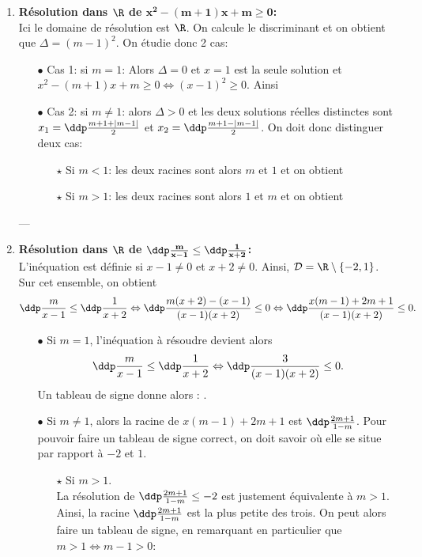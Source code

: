 \documentclass[a4paper, 11pt,reqno]{article}
\begin{document}
\begin{correction} 
\begin{enumerate}
\item \textbf{R\'esolution dans $\mathbf{\R}$ de $\mathbf{x^2-(m+1)x+m\geq 0}$:}\\
\noindent  Ici le domaine de r\'esolution est $\R$. On calcule le discriminant et on obtient que $\Delta=(m-1)^2$. On \'etudie donc 2 cas:
 \begin{itemize}
 \item[$\bullet$] Cas 1: si $m=1$: Alors $\Delta=0$ et $x=1$ est la seule solution et $x^2-(m+1)x+m\geq 0\Leftrightarrow (x-1)^2\geq 0$. Ainsi 
 \item[$\bullet$] Cas 2: si $m\not= 1$: alors $\Delta>0$ et les deux solutions r\'eelles distinctes sont 
 $x_1=\ddp\frac{m+1+|m-1|}{2}$ et $x_2=\ddp\frac{m+1-|m-1|}{2}$. On doit donc distinguer deux cas:
 \begin{itemize}
 \item[$\star$] Si $m<1$: les deux racines sont alors $m$ et $1$ et on obtient 
 \item[$\star$] Si $m>1$: les deux racines sont alors $1$ et $m$ et on obtient 
 \end{itemize}
 \end{itemize}
 ---
\item \textbf{R\'esolution dans $\mathbf{\R}$ de $\mathbf{\ddp\frac{m}{x-1} \leq \ddp\frac{1}{x+2}}$:}\\
\noindent L'in\'equation est d\'efinie si $x-1\not= 0$ et $x+2\not= 0$. Ainsi, $\mathcal{D}=\R\setminus\lbrace  -2,1 \rbrace$.
Sur cet ensemble, on obtient
$$
\ddp\frac{m}{x-1}\leq \ddp\frac{1}{x+2} \Leftrightarrow  \ddp\frac{m(x+2)-(x-1)}{(x-1)(x+2)}\leq 0
\Leftrightarrow  \ddp\frac{x(m-1) +2m+1  }{(x-1)(x+2)}\leq 0.
$$
\begin{itemize}
 \item[$\bullet$] Si $m=1$, l'in\'equation \`a r\'esoudre devient alors 
$$\ddp\frac{m}{x-1}\leq \ddp\frac{1}{x+2} \Leftrightarrow  \ddp\frac{3}{(x-1)(x+2)}\leq 0.$$
Un tableau de signe donne alors : .
\item[$\bullet$]  Si $m\not= 1$, alors la racine de $x(m-1)+2m+1$ est $\ddp\frac{2m+1}{1-m}$.
Pour pouvoir faire un tableau de signe correct, on doit savoir o\`u elle se situe par rapport \`a $-2$ et $1$.
\begin{itemize}
\item[$\star$] Si $m>1$.\\
\noindent La r\'esolution de $\ddp\frac{2m+1}{1-m}\leq -2$ est justement \'equivalente \`a $m>1$. Ainsi, la racine $\ddp\frac{2m+1}{1-m}$ est la plus petite des trois. On peut alors faire un tableau de signe, en remarquant en particulier que $m>1\Leftrightarrow m-1>0$:\\


\end{itemize}
\end{itemize}
\end{enumerate}
\end{correction}
\end{document}
